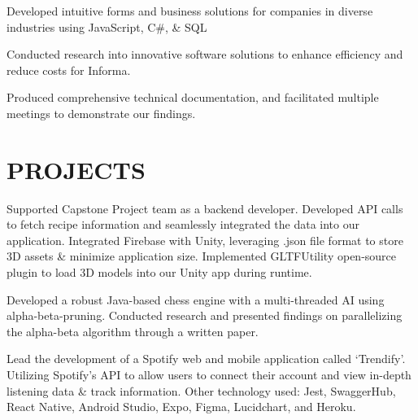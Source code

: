 \documentclass[]{deedy-resume-openfont}
\begin{document}
\date{Jan 2022 – May 2022 | Maitland, FL}
\begin{tightemize}
\item Developed intuitive forms and business solutions for companies in diverse industries using JavaScript, C\#, \& SQL 
\item Conducted research into innovative software solutions to enhance efficiency and reduce costs for Informa. 
\item Produced comprehensive technical documentation, and facilitated multiple meetings to demonstrate our findings.
\end{tightemize}


\section{PROJECTS}
\begin{tightemize}
\item Supported Capstone Project team as a backend developer. Developed API calls to fetch recipe information and seamlessly integrated the data into our application. Integrated Firebase with Unity, leveraging .json file format to store  3D assets \& minimize application size. Implemented  GLTFUtility open-source plugin to load 3D models into our Unity app during runtime.
\end{tightemize}
\sectionsep

\begin{tightemize}
\item Developed a robust Java-based chess engine with a multi-threaded AI using alpha-beta-pruning. 
Conducted research and presented findings on parallelizing the alpha-beta algorithm through a written paper.
\end{tightemize}
\sectionsep

\begin{tightemize}
\item Lead the development of a Spotify web and mobile application called ‘Trendify’. Utilizing Spotify’s API to allow users to connect their account and view in-depth listening data \& track information. Other technology used: Jest, SwaggerHub, React Native, Android Studio, Expo, Figma, Lucidchart, and Heroku.
\end{tightemize}
\end{document}
